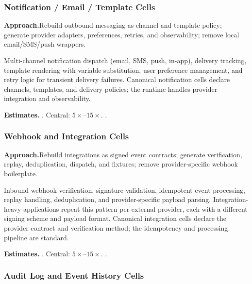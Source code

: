 \subsubsection{Notification / Email / Template Cells}
\label{ssec:notification-cells}

\smallskip\noindent
\textbf{Approach.}\quad Rebuild outbound messaging as channel and template policy; generate provider adapters, preferences, retries, and observability; remove local email/SMS/push wrappers.

Multi-channel notification dispatch (email, SMS, push, in-app), delivery
tracking, template rendering with variable substitution, user preference
management, and retry logic for transient delivery failures.  Canonical
notification cells declare channels, templates, and delivery policies;
the runtime handles provider integration and observability.

\smallskip\noindent
\textbf{Estimates.}\quad
{}.\quad
Central: $5\times$--$15\times$.\quad
{}.

\subsubsection{Webhook and Integration Cells}
\label{ssec:webhook-cells}

\smallskip\noindent
\textbf{Approach.}\quad Rebuild integrations as signed event contracts; generate verification, replay, deduplication, dispatch, and fixtures; remove provider-specific webhook boilerplate.

Inbound webhook verification, signature validation, idempotent event
processing, replay handling, deduplication, and provider-specific payload
parsing.  Integration-heavy applications repeat this pattern per external
provider, each with a different signing scheme and payload format.
Canonical integration cells declare the provider contract and
verification method; the idempotency and processing pipeline are
standard.

\smallskip\noindent
\textbf{Estimates.}\quad
{}.\quad
Central: $5\times$--$15\times$.\quad
{}.

\subsubsection{Audit Log and Event History Cells}
\label{ssec:audit-cells}

